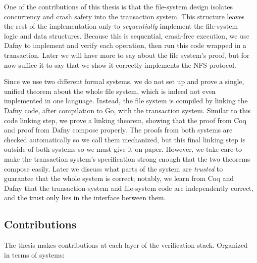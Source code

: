 One of the contributions of this thesis is that the file-system design isolates
concurrency and crash safety into the transaction system. This structure leaves
the rest of the implementation only to \emph{sequentially} implement the
file-system logic and data structures. Because this is sequential, crash-free
execution, we use Dafny to implement and verify each operation, then run this
code wrapped in a transaction. Later we will have more to say about the file
system's proof, but for now suffice it to say that we show it correctly
implements the NFS protocol.

Since we use two different formal systems, we do not set up and prove a single,
unified theorem about the whole file system, which is indeed not even
implemented in one language. Instead, the file system is compiled by linking the
Dafny code, after compilation to Go, with the transaction system. Similar to
this code linking step, we prove a linking theorem, showing that the proof from
Coq and proof from Dafny compose properly. The proofs from both systems are
checked automatically so we call them mechanized, but this final linking step is
outside of both systems so we must give it on paper. However, we take care to
make the transaction system's specification strong enough that the two theorems
compose easily. Later we discuss what parts of the system are \emph{trusted} to
guarantee that the whole system is correct; notably, we learn from Coq and Dafny
that the transaction system and file-system code are independently correct, and
the trust only lies in the interface between them.

\subsection{Contributions}

The thesis makes contributions at each layer of the verification stack.
Organized in terms of systems:

